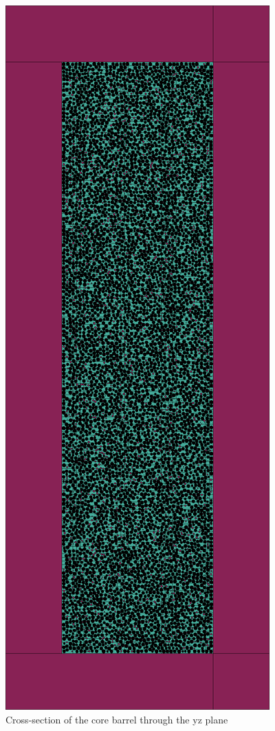 \documentclass{anstrans}
\begin{document}
\begin{figure}[H]
  \centering
  \includegraphics[width = 0.5\linewidth]{htgr-mr-full-core-axial}
  \caption{Cross-section of the core barrel through the yz plane}
  \label{fig:axial-xs}
\end{figure}
\end{document}
